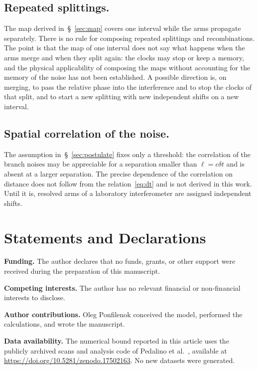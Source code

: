 \documentclass[11pt,a4paper]{article}
\begin{document}
\subsection{Repeated splittings.}
\label{sec:open_repeat}
The map derived in~\S~\ref{sec:map} covers one interval while the arms propagate separately. There is no rule for composing repeated splittings and recombinations. The point is that the map of one interval does not say what happens when the arms merge and when they split again: the clocks may stop or keep a memory, and the physical applicability of composing the maps without accounting for the memory of the noise has not been established. A possible direction is, on merging, to pass the relative phase into the interference and to stop the clocks of that split, and to start a new splitting with new independent shifts on a new interval.

\subsection{Spatial correlation of the noise.}
\label{sec:open_corr}
The assumption in~\S~\ref{sec:postulate} fixes only a threshold: the correlation of the branch noises may be appreciable for a separation smaller than $\ell=c\delta t$ and is absent at a larger separation. The precise dependence of the correlation on distance does not follow from the relation~\eqref{eq:dt} and is not derived in this work. Until it is, resolved arms of a laboratory interferometer are assigned independent shifts.




\section*{Statements and Declarations}

\noindent\textbf{Funding.} The author declares that no funds, grants, or other support were received during the preparation of this manuscript.

\noindent\textbf{Competing interests.} The author has no relevant financial or non-financial interests to disclose.

\noindent\textbf{Author contributions.} Oleg Ponfilenok conceived the model, performed the calculations, and wrote the manuscript.

\noindent\textbf{Data availability.} The numerical bound reported in this article uses the publicly archived scans and analysis code of Pedalino et al.~\cite{arndt_data}, available at \url{https://doi.org/10.5281/zenodo.17502163}. No new datasets were generated.
\end{document}
